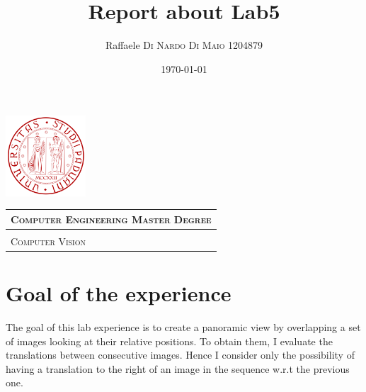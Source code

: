 \documentclass{article}
\title{\textbf{Report about Lab5}} %
\author{Raffaele \textsc{Di Nardo Di Maio} 1204879} %
\date{\today}
\begin{document}
\begin{minipage}{.20\textwidth}
  \includegraphics[height=3cm]{../Icon4}
\end{minipage}\begin{minipage}{.20\textwidth}
  \begin{table}[H]
  \begin{tabular}{l}
  \scshape{\Large{Computer Engineering Master Degree}} \\
  \hline \\
  \scshape{\Large{Computer Vision}} \\
  \end{tabular}
  \end{table}
\end{minipage}
{\let\newpage\relax\maketitle}

\section{Goal of the experience}
The goal of this lab experience is to create a panoramic view by overlapping a set of images looking at their relative positions. To obtain them, I evaluate the translations between consecutive images. Hence I consider only the possibility of having a translation to the right of an image in the sequence w.r.t the previous one.  
\end{document}
